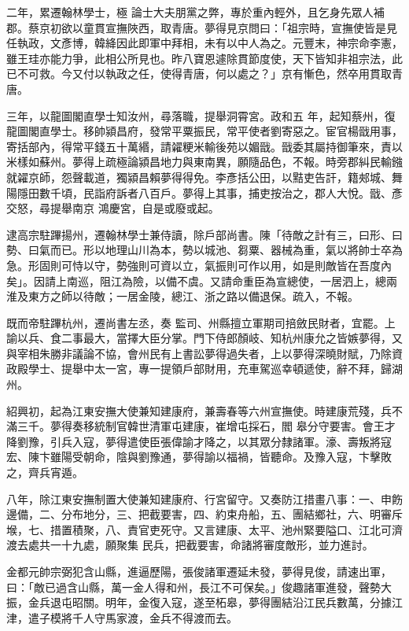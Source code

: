 \begin{pinyinscope}
 二年，累遷翰林學士，極
 論士大夫朋黨之弊，專於重內輕外，且乞身先眾人補郡。蔡京初欲以童貫宣撫陜西，取青唐。夢得見京問曰：「祖宗時，宣撫使皆是見任執政，文彥博，韓絳因此即軍中拜相，未有以中人為之。元豐末，神宗命李憲，雖王珪亦能力爭，此相公所見也。昨八寶恩遽除貫節度使，天下皆知非祖宗法，此已不可救。今又付以執政之任，使得青唐，何以處之？」京有慚色，然卒用貫取青唐。



 三年，以龍圖閣直學士知汝州，尋落職，提舉洞霄宮。政和五
 年，起知蔡州，復龍圖閣直學士。移帥潁昌府，發常平粟振民，常平使者劉寄惡之。宦官楊戩用事，寄括部內，得常平錢五十萬緡，請糴粳米輸後苑以媚戩。戩委其屬持御筆來，責以米樣如蘇州。夢得上疏極論潁昌地力與東南異，願隨品色，不報。時旁郡糾民輸鏹就糴京師，怨聲載道，獨潁昌賴夢得得免。李彥括公田，以黠吏告訐，籍郟城、舞陽隱田數千頃，民詣府訴者八百戶。夢得上其事，捕吏按治之，郡人大悅。戩、彥交怒，尋提舉南京
 鴻慶宮，自是或廢或起。



 逮高宗駐蹕揚州，遷翰林學士兼侍讀，除戶部尚書。陳「待敵之計有三，曰形、曰勢、曰氣而已。形以地理山川為本，勢以城池、芻粟、器械為重，氣以將帥士卒為急。形固則可恃以守，勢強則可資以立，氣振則可作以用，如是則敵皆在吾度內矣」。因請上南巡，阻江為險，以備不虞。又請命重臣為宣總使，一居泗上，總兩淮及東方之師以待敵；一居金陵，總江、浙之路以備退保。疏入，不報。



 既而帝駐蹕杭州，遷尚書左丞，奏
 監司、州縣擅立軍期司掊斂民財者，宜罷。上諭以兵、食二事最大，當擇大臣分掌。門下侍郎顏岐、知杭州康允之皆嫉夢得，又與宰相朱勝非議論不協，會州民有上書訟夢得過失者，上以夢得深曉財賦，乃除資政殿學士、提舉中太一宮，專一提領戶部財用，充車駕巡幸頓遞使，辭不拜，歸湖州。



 紹興初，起為江東安撫大使兼知建康府，兼壽春等六州宣撫使。時建康荒殘，兵不滿三千。夢得奏移統制官韓世清軍屯建康，崔增屯採石，閻
 皋分守要害。會王才降劉豫，引兵入寇，夢得遣使臣張偉諭才降之，以其眾分隸諸軍。濠、壽叛將寇宏、陳卞雖陽受朝命，陰與劉豫通，夢得諭以福禍，皆聽命。及豫入寇，卞擊敗之，齊兵宵遁。



 八年，除江東安撫制置大使兼知建康府、行宮留守。又奏防江措畫八事：一、申飭邊備，二、分布地分，三、把截要害，四、約束舟船，五、團結鄉社，六、明審斥堠，七、措置積聚，八、責官吏死守。又言建康、太平、池州緊要隘口、江北可濟渡去處共一十九處，願聚集
 民兵，把截要害，命諸將審度敵形，並力進討。



 金都元帥宗弼犯含山縣，進逼歷陽，張俊諸軍遷延未發，夢得見俊，請速出軍，曰：「敵已過含山縣，萬一金人得和州，長江不可保矣。」俊趣諸軍進發，聲勢大振，金兵退屯昭關。明年，金復入寇，遂至柘皋，夢得團結沿江民兵數萬，分據江津，遣子模將千人守馬家渡，金兵不得渡而去。




\end{pinyinscope}
